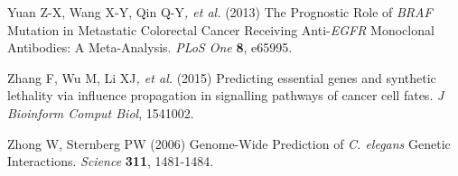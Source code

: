 Yuan Z-X, Wang X-Y, Qin Q-Y\textit{, et al.} (2013) The Prognostic Role
of \textit{BRAF} Mutation in Metastatic Colorectal Cancer Receiving
Anti-\textit{EGFR} Monoclonal Antibodies: A Meta-Analysis. \textit{PLoS
One} \textbf{8}, e65995.



\hypertarget{ENREF117}{}Zhang F, Wu M, Li XJ\textit{, et al.} (2015)
Predicting essential genes and synthetic lethality via influence
propagation in signalling pathways of cancer cell fates. \textit{J
Bioinform Comput Biol}, 1541002.



\hypertarget{ENREF118}{}Zhong W, Sternberg PW (2006) Genome-Wide
Prediction of \textit{C. elegans} Genetic Interactions.
\textit{Science} \textbf{311}, 1481-1484.



%
